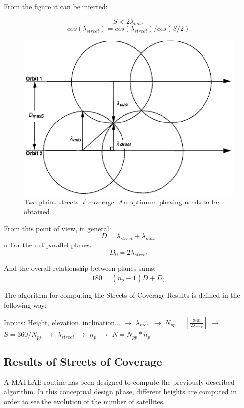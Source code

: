 From the figure it can be inferred:

$$S < 2\lambda_{max}$$
$$cos(\lambda_{street}) = cos(\lambda_{street})/cos(S/2)$$

\begin{figure}[H]
\begin{center}
\includegraphics[scale=0.7]{PolarOrbits/planeseps.png}
\caption{Two plains streets of coverage. An optimum phasing needs to be obtained.}
\end{center}
\end{figure}

From this point of view, in general:
$$D = \lambda_{street} + \lambda_{max}$$
n
For the antiparallel planes:
$$D_{0} = 2\lambda_{street}$$

And the overall relationship between planes sums:
$$180 = (n_{p}-1)D + D_{0}$$

The algorithm for computing the Streets of Coverage Results is defined in the following way:

\begin{center}
Inputs: Height, elevation, inclination... 
$\rightarrow$
$\lambda_{max}$
$\rightarrow$
$N_{pp}=\left \lceil \frac{360}{2 \lambda_{max}}  \right \rceil$
$\rightarrow$
\newline
$S=360/N_{pp}$
$\rightarrow$
$\lambda_{street}$
$\rightarrow$
$n_{p}$
$\rightarrow$
$N=N_{pp}*n_{p}$
\end{center}

\newpage
\subsection{Results of Streets of Coverage}
A MATLAB routine has been designed to compute the previously described algorithm. In this conceptual design phase, different heights are computed in order to see the evolution of the number of satellites.

